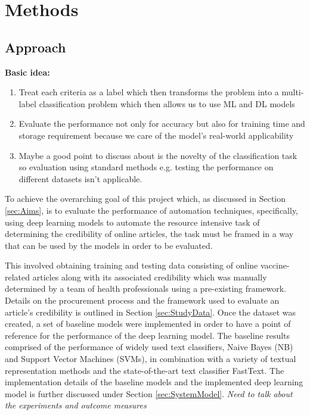 \documentclass[a4paper,twoside,phd]{BYUPhys}
\begin{document}
\chapter{Methods}
\label{chap:Methods}

\section{Approach}
\label{sec:Approach}

\textbf{Basic idea:}
\begin{enumerate}[-]

	\item Treat each criteria as a label which then transforms the problem into a multi-label classification problem which then allows us to use ML and DL models
	\item Evaluate the performance not only for accuracy but also for training time and storage requirement because we care of the model's real-world applicability
	\item Maybe a good point to discuss about is the novelty of the classification task so evaluation using standard methods e.g. testing the performance on different datasets isn't applicable.
\end{enumerate}

To achieve the overarching goal of this project which, as discussed in Section \ref{sec:Aims}, is to evaluate the performance of automation techniques, specifically, using deep learning models to automate the resource intensive task of determining the credibility of online articles, the task must be framed in a way that can be used by the models in order to be evaluated. \newline

This involved obtaining training and testing data consisting of online vaccine-related articles along with its associated credibility which was manually determined by a team of health professionals using a pre-existing framework. Details on the procurement process and the framework used to evaluate an article's credibility is outlined in Section \ref{sec:StudyData}. 
Once the dataset was created, a set of baseline models were implemented in order to have a point of reference for the performance of the deep learning model. The baseline results comprised of the performance of widely used text classifiers, Naive Bayes (NB) and Support Vector Machines (SVMs), in combination with a variety of textual representation methods and the state-of-the-art text classifier FastText. The implementation details of the baseline models and the implemented deep learning model is further discussed under Section \ref{sec:SystemModel}. 
\textit{Need to talk about the experiments and outcome measures}
\end{document}
